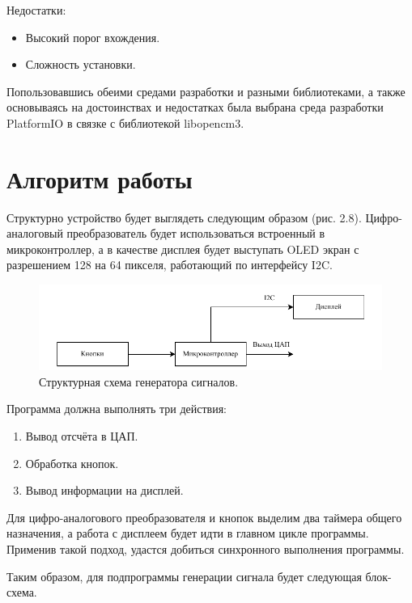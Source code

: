 	Недостатки:
	\begin{itemize}
		\item Высокий порог вхождения.
		\item Сложность установки.
	\end{itemize}

	Попользовавшись обеими средами разработки и разными библиотеками, а также основываясь на достоинствах и недостатках была выбрана среда разработки PlatformIO в связке с библиотекой libopencm3.


\section{Алгоритм работы}

	Структурно устройство будет выглядеть следующим образом (рис. 2.8). Цифро-аналоговый преобразователь будет использоваться встроенный в микроконтроллер, а в качестве дисплея будет выступать OLED экран с разрешением 128 на 64 пикселя, работающий по интерфейсу I2C.
	
	\begin{figure}[H]
    \centering
    \includegraphics[width=1\textwidth]{../image/struct_gen.pdf}
    \caption{Структурная схема генератора сигналов.}
	\end{figure}

	Программа должна выполнять три действия:
	
	\begin{enumerate}
		\item Вывод отсчёта в ЦАП.
		\item Обработка кнопок.
		\item Вывод информации на дисплей.
	\end{enumerate}
	
	
	Для цифро-аналогового преобразователя и кнопок выделим два таймера общего назначения, а работа с дисплеем будет идти в главном цикле программы. Применив такой подход, удастся добиться синхронного выполнения программы. 
	
	Таким образом, для подпрограммы генерации сигнала будет следующая блок-схема.
	
